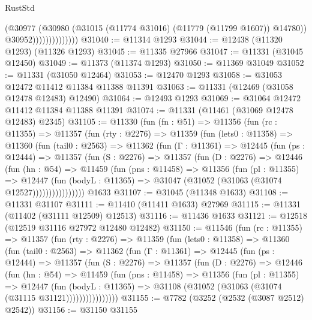 \begin{lexlean}{RustStd}
\begin{coremodule}
                              (@30977
                                (@30980 (@31015 (@11774 @31016) (@11779 (@11799 @1607)) @14780))
                                @30952))))))))))))))
@31040 := @11314 @1293
@31044 := @12438 (@11320 @1293) (@11326 @1293)
@31045 := @11335 @27966
@31047 := @11331 (@31045 @12450)
@31049 := @11373 (@11374 @1293)
@31050 := @11369 @31049
@31052 := @11331 (@31050 @12464)
@31053 := @12470 @1293
@31058 := @31053 @12472 @11412 @11384 @11388 @11391
@31063 := @11331 (@12469 (@31058 @12478 @12483) @12490)
@31064 := @12493 @1293
@31069 := @31064 @12472 @11412 @11384 @11388 @11391
@31074 := @11331 (@11461 (@31069 @12478 @12483) @2345)
@31105 := @11330
    (fun (fn : @51) =>
    @11356
      (fun (rc : @11355) =>
      @11357
        (fun (rty : @2276) =>
        @11359
          (fun (lets0 : @11358) =>
          @11360
            (fun (tail0 : @2563) =>
            @11362
              (fun (Γ : @11361) =>
              @12445
                (fun (ps : @12444) =>
                @11357
                  (fun (S : @2276) =>
                  @11357
                    (fun (D : @2276) =>
                    @12446
                      (fun (hn : @54) =>
                      @11459
                        (fun (pns : @11458) =>
                        @11356
                          (fun (pl : @11355) =>
                          @12447
                            (fun (bodyL : @11365) =>
                            @31047 (@31052 (@31063 (@31074 @12527))))))))))))))))
    @1633
@31107 := @31045 (@11348 @1633)
@31108 := @11331 @31107
@31111 := @11410 (@11411 @1633) @27969
@31115 := @11331 (@11402 (@31111 @12509) @12513)
@31116 := @11436 @1633
@31121 := @12518 (@12519 @31116 @27972 @12480 @12482)
@31150 := @11546
    (fun (rc : @11355) =>
    @11357
      (fun (rty : @2276) =>
      @11359
        (fun (lets0 : @11358) =>
        @11360
          (fun (tail0 : @2563) =>
          @11362
            (fun (Γ : @11361) =>
            @12445
              (fun (ps : @12444) =>
              @11357
                (fun (S : @2276) =>
                @11357
                  (fun (D : @2276) =>
                  @12446
                    (fun (hn : @54) =>
                    @11459
                      (fun (pns : @11458) =>
                      @11356
                        (fun (pl : @11355) =>
                        @12447
                          (fun (bodyL : @11365) =>
                          @31108 (@31052 (@31063 (@31074 (@31115 @31121))))))))))))))))
@31155 := @7782 (@3252 (@2532 (@3087 @2512) @2542))
@31156 := @31150 @31155

\end{coremodule}
\end{lexlean}

